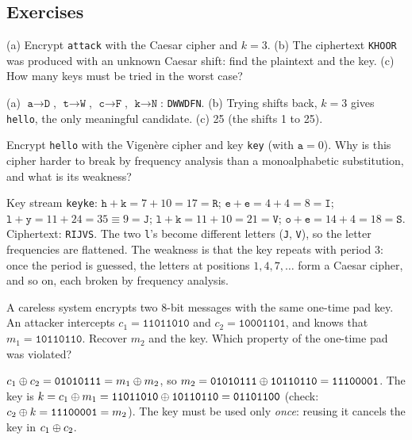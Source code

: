 \subsection*{Exercises}

\begin{exercise}
(a) Encrypt \texttt{attack} with the Caesar cipher and $k=3$. (b) The ciphertext \texttt{KHOOR} was produced with an unknown Caesar shift: find the plaintext and the key. (c) How many keys must be tried in the worst case?
\end{exercise}
\begin{solution}
(a) $\texttt{a}\to\texttt{D}$, $\texttt{t}\to\texttt{W}$, $\texttt{c}\to\texttt{F}$, $\texttt{k}\to\texttt{N}$: \texttt{DWWDFN}. (b) Trying shifts back, $k=3$ gives \texttt{hello}, the only meaningful candidate. (c) 25 (the shifts 1 to 25).
\end{solution}

\begin{exercise}
Encrypt \texttt{hello} with the Vigenère cipher and key \texttt{key} (with $\texttt{a}=0$). Why is this cipher harder to break by frequency analysis than a monoalphabetic substitution, and what is its weakness?
\end{exercise}
\begin{solution}
Key stream \texttt{keyke}: $\texttt{h}+\texttt{k} = 7+10 = 17 = \texttt{R}$; $\texttt{e}+\texttt{e} = 4+4 = 8 = \texttt{I}$; $\texttt{l}+\texttt{y} = 11+24 = 35 \equiv 9 = \texttt{J}$; $\texttt{l}+\texttt{k} = 11+10 = 21 = \texttt{V}$; $\texttt{o}+\texttt{e} = 14+4 = 18 = \texttt{S}$. Ciphertext: \texttt{RIJVS}. The two \texttt{l}'s become different letters (\texttt{J}, \texttt{V}), so the letter frequencies are flattened. The weakness is that the key repeats with period 3: once the period is guessed, the letters at positions $1,4,7,\dots$ form a Caesar cipher, and so on, each broken by frequency analysis.
\end{solution}

\begin{exercise}
A careless system encrypts two 8-bit messages with the same one-time pad key. An attacker intercepts $c_1 = \texttt{11011010}$ and $c_2 = \texttt{10001101}$, and knows that $m_1 = \texttt{10110110}$. Recover $m_2$ and the key. Which property of the one-time pad was violated?
\end{exercise}
\begin{solution}
$c_1 \oplus c_2 = \texttt{01010111} = m_1 \oplus m_2$, so $m_2 = \texttt{01010111} \oplus \texttt{10110110} = \texttt{11100001}$. The key is $k = c_1 \oplus m_1 = \texttt{11011010} \oplus \texttt{10110110} = \texttt{01101100}$ (check: $c_2 \oplus k = \texttt{11100001} = m_2$). The key must be used only \emph{once}: reusing it cancels the key in $c_1 \oplus c_2$.
\end{solution}

